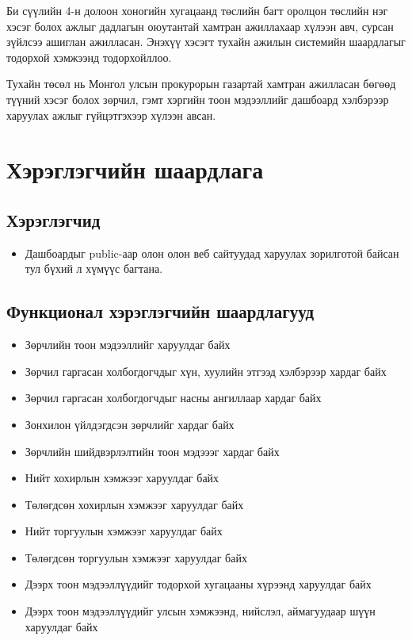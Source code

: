 Би сүүлийн 4-н долоон хоногийн хугацаанд төслийн багт оролцон төслийн нэг хэсэг болох ажлыг дадлагын оюутантай хамтран ажиллахаар хүлээн авч, сурсан зүйлсээ ашиглан ажилласан. Энэхүү хэсэгт тухайн ажилын системийн шаардлагыг тодорхой хэмжээнд тодорхойллоо.

\quad \quad Тухайн төсөл нь Монгол улсын прокурорын газартай хамтран ажилласан бөгөөд түүний хэсэг болох зөрчил, гэмт хэргийн тоон мэдээллийг дашбоард хэлбэрээр харуулах ажлыг гүйцэтгэхээр хүлээн авсан.
\section{Хэрэглэгчийн шаардлага}
  \subsection{Хэрэглэгчид}
    \begin{itemize}
        \item Дашбоардыг public-аар олон олон веб сайтуудад харуулах зорилготой байсан тул бүхий л хүмүүс багтана.
    \end{itemize}
	\subsection{Функционал хэрэглэгчийн шаардлагууд}
     \begin{itemize}
        \item Зөрчлийн тоон мэдээллийг харуулдаг байх
        \item Зөрчил гаргасан холбогдогчдыг хүн, хуулийн этгээд хэлбэрээр хардаг байх
        \item Зөрчил гаргасан холбогдогчдыг насны ангиллаар хардаг байх
        \item Зонхилон үйлдэгдсэн зөрчлийг хардаг байх
        \item Зөрчлийн шийдвэрлэлтийн тоон мэдэээг хардаг байх
        \item Нийт хохирлын хэмжээг харуулдаг байх
        \item Төлөгдсөн хохирлын хэмжээг харуулдаг байх
        \item Нийт торгуулын хэмжээг харуулдаг байх
        \item Төлөгдсөн торгуулын хэмжээг харуулдаг байх
        \item Дээрх тоон мэдээллүүдийг тодорхой хугацааны хүрээнд харуулдаг байх
        \item Дээрх тоон мэдээллүүдийг улсын хэмжээнд, нийслэл, аймагуудаар шүүн харуулдаг байх
    \end{itemize}
